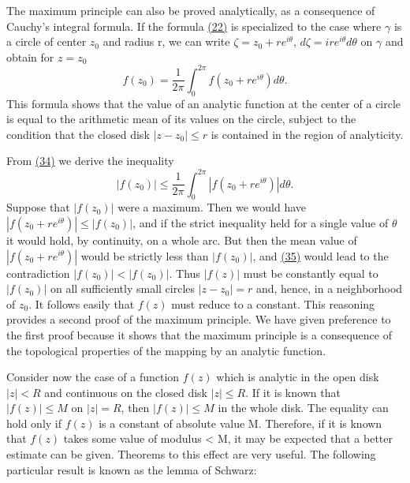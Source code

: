 The maximum principle can also be proved analytically, as a consequence of Cauchy's integral formula. If the formula \hyperref[eq:4.22]{(22)} is specialized to the case where $\gamma$ is a circle of center $z_{0}$ and radius r, we can write $\zeta = z_{0} + re^{i\theta}$, $d\zeta = ire^{i\theta}d\theta$ on $\gamma$ and obtain for $z = z_{0}$
\begin{equation*}
f (z _ {0}) = \frac {1}{2 \pi} \int_ {0} ^ {2 \pi} f (z _ {0} + r e ^ {i \theta}) d \theta .\tag{34}\label{eq:4.34}
\end{equation*}
This formula shows that the value of an analytic function at the center of a circle is equal to the arithmetic mean of its values on the circle, subject to the condition that the closed disk $|z - z_{0}| \leq r$ is contained in the region of analyticity.

From \hyperref[eq:4.34]{(34)} we derive the inequality
\begin{equation*}
\left| f (z _ {0}) \right| \leq \frac {1}{2 \pi} \int_ {0} ^ {2 \pi} \left| f (z _ {0} + r e ^ {i \theta}) \right| d \theta .\tag{35}\label{eq:4.35}
\end{equation*}
Suppose that $|f(z_0)|$ were a maximum. Then we would have $|f(z_0 + re^{i\theta})| \leq |f(z_0)|$, and if the strict inequality held for a single value of $\theta$ it would hold, by continuity, on a whole arc. But then the mean value of $|f(z_0 + re^{i\theta})|$ would be strictly less than $|f(z_0)|$, and \hyperref[eq:4.35]{(35)} would lead to the contradiction $|f(z_0)| < |f(z_0)|$. Thus $|f(z)|$ must be constantly equal to $|f(z_0)|$ on all sufficiently small circles $|z - z_0| = r$ and, hence, in a neighborhood of $z_0$. It follows easily that $f(z)$ must reduce to a constant. This reasoning provides a second proof of the maximum principle. We have given preference to the first proof because it shows that the maximum principle is a consequence of the topological properties of the mapping by an analytic function.

Consider now the case of a function $f(z)$ which is analytic in the open disk $|z| < R$ and continuous on the closed disk $|z| \leq R$. If it is known that $|f(z)| \leq M$ on $|z| = R$, then $|f(z)| \leq M$ in the whole disk. The equality can hold only if $f(z)$ is a constant of absolute value M. Therefore, if it is known that $f(z)$ takes some value of modulus < M, it may be expected that a better estimate can be given. Theorems to this effect are very useful. The following particular result is known as the lemma of Schwarz:

